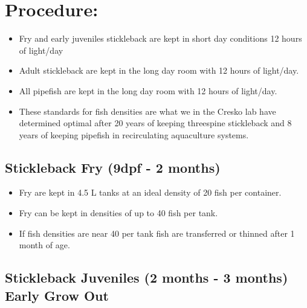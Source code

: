 \documentclass[
  letterpaper,
  DIV=11,
  numbers=noendperiod]{scrreprt}
\providecommand{\tightlist}{%
  \setlength{\itemsep}{0pt}\setlength{\parskip}{0pt}}\usepackage{longtable,booktabs,array}
\begin{document}
\hypertarget{procedure-48}{%
\section{Procedure:}\label{procedure-48}}

\begin{tcolorbox}[enhanced jigsaw, toprule=.15mm, breakable, coltitle=black, leftrule=.75mm, title=\textcolor{quarto-callout-note-color}{\faInfo}\hspace{0.5em}{NOTES}, bottomrule=.15mm, toptitle=1mm, bottomtitle=1mm, colframe=quarto-callout-note-color-frame, opacityback=0, colback=white, opacitybacktitle=0.6, colbacktitle=quarto-callout-note-color!10!white, rightrule=.15mm, titlerule=0mm, arc=.35mm, left=2mm]

\begin{itemize}
\tightlist
\item
  Fry and early juveniles stickleback are kept in short day conditions
  12 hours of light/day
\item
  Adult stickleback are kept in the long day room with 12 hours of
  light/day.
\item
  All pipefish are kept in the long day room with 12 hours of light/day.
\item
  These standards for fish densities are what we in the Cresko lab have
  determined optimal after 20 years of keeping threespine stickleback
  and 8 years of keeping pipefish in recirculating aquaculture systems.
\end{itemize}

\end{tcolorbox}

\hypertarget{stickleback-fry-9dpf---2-months}{%
\subsection{Stickleback Fry (9dpf - 2
months)}\label{stickleback-fry-9dpf---2-months}}

\begin{itemize}
\tightlist
\item
  Fry are kept in 4.5 L tanks at an ideal density of 20 fish per
  container.
\item
  Fry can be kept in densities of up to 40 fish per tank.
\item
  If fish densities are near 40 per tank fish are transferred or thinned
  after 1 month of age.
\end{itemize}

\hypertarget{stickleback-juveniles-2-months---3-months-early-grow-out}{%
\subsection{Stickleback Juveniles (2 months - 3 months) Early Grow
Out}\label{stickleback-juveniles-2-months---3-months-early-grow-out}}
\end{document}
